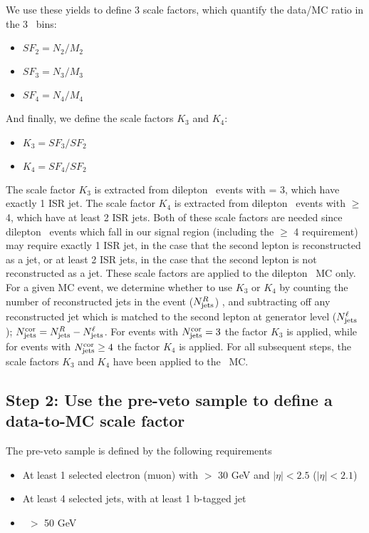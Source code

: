 We use these yields to define 3 scale factors, which quantify the data/MC ratio in the 3 \njets\ bins:

\begin{itemize}
\item $SF_2 = N_2 / M_2$
\item $SF_3 = N_3 / M_3$
\item $SF_4 = N_4 / M_4$
\end{itemize}

And finally, we define the scale factors $K_3$ and $K_4$:

\begin{itemize}
\item $K_3 = SF_3 / SF_2$
\item $K_4 = SF_4 / SF_2$
\end{itemize}

The scale factor $K_3$ is extracted from dilepton \ttbar\ events with \njets = 3, which have exactly 1 ISR jet.
The scale factor $K_4$ is extracted from dilepton \ttbar\ events with \njets $\geq$ 4, which have at least 2 ISR jets.
Both of these scale factors are needed since dilepton \ttbar\ events which fall in our signal region (including
the \njets $\geq$ 4 requirement) may require exactly 1 ISR jet, in the case that the second lepton is reconstructed
as a jet, or at least 2 ISR jets, in the case that the second lepton is not reconstructed as a jet. These scale
factors are applied to the dilepton \ttbar\ MC only. For a given MC event, we determine whether to use $K_3$ or $K_4$
by counting the number of reconstructed jets in the event ($N_{\rm{jets}}^R$) , and subtracting off any reconstructed 
jet which is matched to the second lepton at generator level ($N_{\rm{jets}}^\ell$); $N_{\rm{jets}}^{\rm{cor}} = N_{\rm{jets}}^R - N_{\rm{jets}}^\ell$.
For events with $N_{\rm{jets}}^{\rm{cor}}=3$ the factor $K_3$ is applied, while for events with $N_{\rm{jets}}^{\rm{cor}}\geq4$ the factor $K_4$ is applied.
For all subsequent steps, the scale factors $K_3$ and $K_4$ have been applied to the \ttll\ MC.
 
\subsection{Step 2: Use the pre-veto sample to define a data-to-MC scale factor}

The pre-veto sample is defined by the following requirements

\begin{itemize}
\item At least 1 selected electron (muon) with \pt $>$ 30 GeV and $|\eta|<2.5$ ($|\eta|<2.1$)
\item At least 4 selected jets, with at least 1 b-tagged jet
\item \met\ $>$ 50 GeV
\end{itemize}

